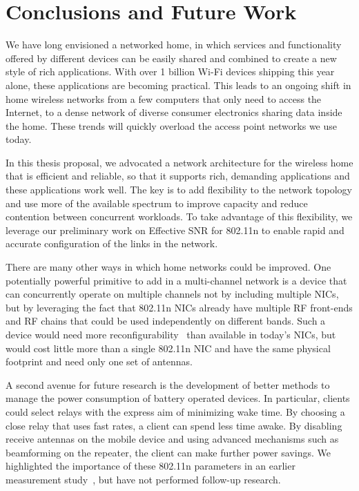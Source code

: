 \section{Conclusions and Future Work}
\label{sec:conclusion}
We have long envisioned a networked home, in which services and functionality offered by different devices can be easily shared and combined to create a new style of rich applications. With over 1 billion Wi-Fi devices shipping this year alone, these applications are becoming practical. This leads to an ongoing shift in home wireless networks from a few computers that only need to access the Internet, to a dense network of diverse consumer electronics sharing data inside the home. These trends will quickly overload the access point networks we use today.

In this thesis proposal, we advocated a network architecture for the wireless home that is efficient and reliable, so that it supports rich, demanding applications and these applications work well. The key is to add flexibility to the network topology and use more of the available spectrum to improve capacity and reduce contention between concurrent workloads. To take advantage of this flexibility, we leverage our preliminary work on Effective SNR for 802.11n to enable rapid and accurate configuration of the links in the network.

There are many other ways in which home networks could be improved. One potentially powerful primitive to add in a multi-channel network is a device that can concurrently operate on multiple channels not by including multiple NICs, but by leveraging the fact that 802.11n NICs already have multiple RF front-ends and RF chains that could be used independently on different bands. Such a device would need more reconfigurability~\cite{hoffman_scc,ng_airblue} than available in today's NICs, but would cost little more than a single 802.11n NIC and have the same physical footprint and need only one set of antennas.

A second avenue for future research is the development of better methods to manage the power consumption of battery operated devices. In particular, clients could select relays with the express aim of minimizing wake time. By choosing a close relay that uses fast rates, a client can spend less time awake. By disabling receive antennas on the mobile device and using advanced mechanisms such as beamforming on the repeater, the client can make further power savings. We highlighted the importance of these 802.11n parameters in an earlier measurement study~\cite{halperin_power}, but have not performed follow-up research.

